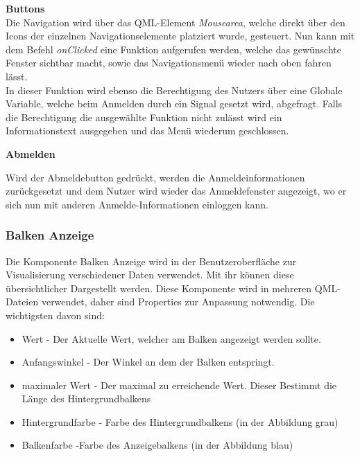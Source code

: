 \textbf{Buttons} \\
\vspace{2mm}
Die Navigation wird über das QML-Element \textit{Mousearea}, welche direkt über den Icons der einzelnen Navigationselemente platziert wurde, gesteuert. Nun kann mit dem Befehl \textit{onClicked} eine Funktion aufgerufen werden, welche das gewünschte Fenster sichtbar macht, sowie das Navigationsmenü wieder nach oben fahren lässt.\\
In dieser Funktion wird ebenso die Berechtigung des Nutzers über eine Globale Variable, welche beim Anmelden durch ein Signal gesetzt wird, abgefragt. Falls die Berechtigung die ausgewählte Funktion nicht zulässt wird ein Informationstext ausgegeben und das Menü wiederum geschlossen.\

\textbf{Abmelden} \\
\vspace{2mm}

Wird der Abmeldebutton gedrückt, werden die Anmeldeinformationen zurückgesetzt und dem Nutzer wird wieder das Anmeldefenster angezeigt, wo er sich nun mit anderen Anmelde-Informationen einloggen kann.

\newpage

\subsubsection{Balken Anzeige}

Die Komponente Balken Anzeige wird in der Benutzeroberfläche zur Visualisierung verschiedener Daten verwendet. Mit ihr können diese übersichtlicher Dargestellt werden. Diese Komponente wird in mehreren QML-Dateien verwendet, daher sind Properties zur Anpassung notwendig. Die wichtigsten davon sind:

\begin{itemize}
	\item Wert - Der Aktuelle Wert, welcher am Balken angezeigt werden sollte.
	\item Anfangswinkel - Der Winkel an dem der Balken entspringt.
	\item maximaler Wert - Der maximal zu erreichende Wert. Dieser Bestimmt die Länge des Hintergrundbalkens
	\item Hintergrundfarbe - Farbe des Hintergrundbalkens (in der Abbildung grau)
	\item Balkenfarbe -Farbe des Anzeigebalkens (in der Abbildung blau)
\end{itemize}

